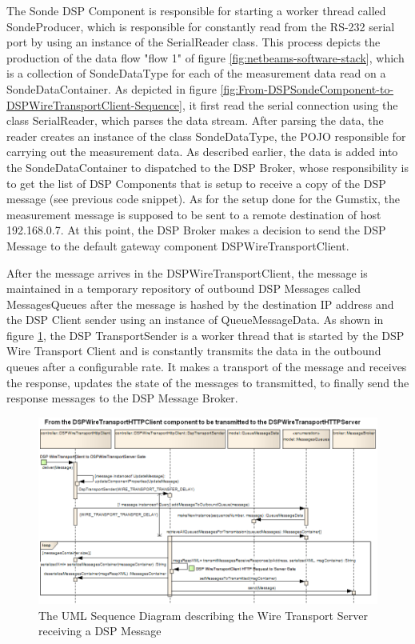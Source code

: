 The Sonde DSP Component is responsible for starting a worker thread called
SondeProducer, which is responsible for constantly read from the RS-232 serial
port by using an instance of the SerialReader class. This process depicts the
production of the data flow "flow 1" of figure
\ref{fig:netbeams-software-stack}, which is a collection of SondeDataType for
each of the measurement data read on a SondeDataContainer. As depicted in
figure \ref{fig:From-DSPSondeComponent-to-DSPWireTransportClient-Sequence}, it
first read the serial connection using the class SerialReader, which parses 
the data stream. After parsing the data, the reader creates an instance of the
class SondeDataType, the POJO responsible for carrying out the measurement
data. As described earlier, the data is added into the SondeDataContainer to
dispatched to the DSP Broker, whose responsibility is to get the list of DSP
Components that is setup to receive a copy of the DSP message (see previous
code snippet). As for the setup done for the Gumstix, the measurement message
is supposed to be sent to a remote destination of host 192.168.0.7. At this
point, the DSP Broker makes a decision to send the DSP Message to the default
gateway component DSPWireTransportClient.

After the message arrives in the DSPWireTransportClient, the message is
maintained in a temporary repository of outbound DSP Messages called
MessagesQueues after the message is hashed by the destination IP address and
the DSP Client sender using an instance of QueueMessageData. As shown in figure
\ref{fig:From-DSPWireTransport-Client-to-DSPWireTransportServer-Sequence}, the
DSP TransportSender is a worker thread that is started by the DSP Wire
Transport Client and is constantly transmits the data in the outbound queues
after a configurable rate. It makes a transport of the message and receives
the response, updates the state of the messages to transmitted, to finally
send the response messages to the DSP Message Broker.

\begin{figure}[!t]
  \centering
  \includegraphics[scale=0.5]{../diagrams/From-DSPWireTransport-Client-to-DSPWireTransportServer-Sequence}
  \caption{The UML Sequence Diagram describing the Wire Transport Server
  receiving a DSP Message}
  \label{fig:From-DSPWireTransport-Client-to-DSPWireTransportServer-Sequence}
\end{figure}

